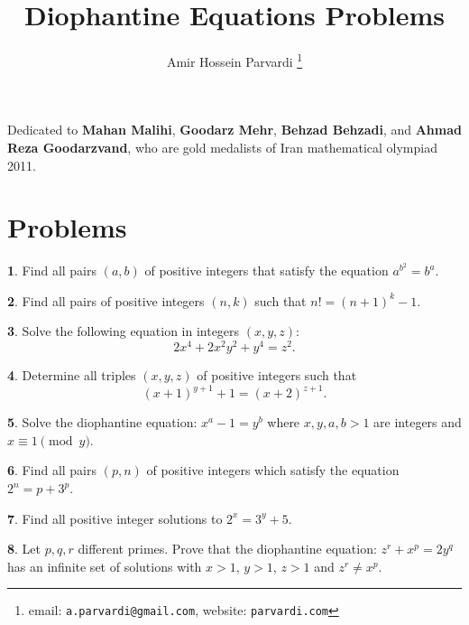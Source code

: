 \documentclass{article}
\theoremstyle{definition}
\newtheorem{p}{}
\begin{document}
	\title{Diophantine Equations Problems}\author{Amir Hossein Parvardi \thanks{email: \texttt{a.parvardi@gmail.com}, website: \texttt{parvardi.com}}}  \maketitle
	
	\[\]
	\[\]
	\[\]
	\[\]
	\[\]
	Dedicated to  {\bf Mahan Malihi},  {\bf Goodarz Mehr}, {\bf Behzad Behzadi}, and {\bf Ahmad Reza Goodarzvand}, who are gold medalists of Iran mathematical olympiad 2011.
	\[\]
	\[\]
	\newpage
	\section{Problems}
	\begin{p}
		Find all pairs $(a,b)$ of positive integers that satisfy the equation $a^{b^2} = b^a$.
	\end{p}
	
	\begin{p}
		Find all pairs of positive integers $(n,k)$ such that $n!=( n+1)^{k}-1$.
	\end{p}
	
	\begin{p}
		Solve the following equation in integers $(x, y, z)$:
		\[2x^4 + 2x^2y^2 + y^4 = z^2.\]
	\end{p}
	
	
	
	\begin{p}
		Determine all triples $(x,y,z)$ of positive integers such that
		\[ (x+1)^{y+1}+1=(x+2)^{z+1}.\]
	\end{p}
	
	
	\begin{p}
		Solve the diophantine equation: $x^a-1=y^b$ where $x,y,a,b>1$ are integers and $x\equiv 1 \pmod y$.
	\end{p}
	
	
	
	
	\begin{p}
		Find all pairs $(p,n)$ of positive integers which satisfy the equation $2^n=p+3^p$.
	\end{p}
	
	
	\begin{p}
		Find all positive integer solutions to $2^x = 3^y + 5$.
	\end{p}
	
	
	\begin{p}
		Let $p,q,r$ different primes. Prove that the diophantine equation: $z^r +x^p=2y^q$ has an infinite set of solutions with $x>1$, $y>1$, $z>1$ and $z^r\neq x^p$.
	\end{p}
	
\end{document}
